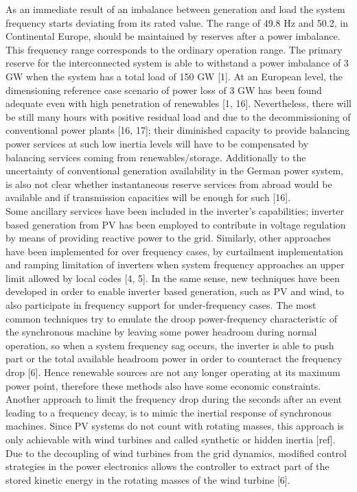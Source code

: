   As an immediate result of an imbalance between generation and load the system frequency starts deviating from its rated value. The range of 49.8 Hz and 50.2, in Continental Europe, should be maintained by reserves after a power imbalance. This frequency range corresponds to the ordinary operation range. The primary reserve for the interconnected system is able to withstand a power imbalance of 3 GW when the system has a total load of 150 GW [1].
  At an European level, the dimensioning reference case scenario of power loss of 3 GW has been found adequate even with high penetration of renewables [1, 16]. Nevertheless, there will be still many hours with positive residual load and due to the decommissioning of conventional power plants [16, 17]; their diminished capacity to provide balancing power services at such low inertia levels will have to be compensated by balancing services coming from renewables/storage. Additionally to the uncertainty of conventional generation availability in the German power system, is also not clear whether instantaneous reserve services from abroad would be available and if transmission capacities will be enough for such [16].\\  
 
 Some ancillary services have been included in the inverter’s capabilities; inverter based generation from PV has been employed to contribute in voltage regulation by means of providing reactive power to the grid. Similarly, other approaches have been implemented for over frequency cases, by curtailment implementation and ramping limitation of inverters when system frequency approaches an upper limit allowed by local codes [4, 5]. In the same sense, new techniques have been developed in order to enable inverter based generation, such as PV and wind, to also participate in frequency support for under-frequency cases. The most common techniques try to emulate the droop power-frequency characteristic of the synchronous machine by leaving some power headroom during normal operation, so when a system frequency sag occurs, the inverter is able to push part or the total available headroom power in order to counteract the frequency drop [6]. Hence renewable sources are not any longer operating at its maximum power point, therefore these methods also have some economic constraints. Another approach to limit the frequency drop during the seconds after an event leading to a frequency decay, is to mimic the inertial response of synchronous machines. Since PV systems do not count with rotating masses, this approach is only achievable with wind turbines and called synthetic or hidden inertia [ref]. Due to the decoupling of wind turbines from the grid dynamics, modified control strategies in the power electronics allows the controller to extract part of the stored kinetic energy in the rotating masses of the wind turbine [6]. \\
 
